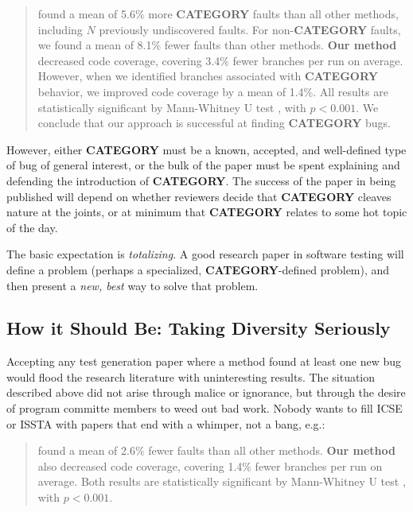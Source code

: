 \documentclass[sigplan,review]{acmart}
\begin{document}
\begin{quote}
 found a mean of 5.6\% more {\bf CATEGORY} faults than all
other methods, including $N$ previously undiscovered faults.  For
non-{\bf CATEGORY} faults, we found a mean of 8.1\% fewer faults than
other methods. {\bf Our
  method} decreased code coverage, covering 3.4\% fewer branches
per run on average.  However, when we identified branches associated
with {\bf CATEGORY} behavior, we improved code coverage by a mean of
1.4\%.  All results are statistically significant by
Mann-Whitney U test \cite{arcuri2014hitchhiker}, with $p < 0.001$.  We
conclude that our approach is successful at finding {\bf CATEGORY} bugs.
\end{quote}

However, either {\bf CATEGORY} must be a known, accepted, and
well-defined type of bug of general interest, or the bulk of the paper
must be spent explaining and defending the introduction of {\bf
  CATEGORY}.  The success of the paper in being published will depend
on whether reviewers decide that {\bf CATEGORY} cleaves nature at the
joints, or at minimum that {\bf CATEGORY} relates to some hot topic of
the day.

The basic expectation is \emph{totalizing}.  A good research paper in
software testing will define a problem (perhaps a specialized, {\bf
  CATEGORY}-defined problem), and then present a \emph{new, best} way
to solve that problem.

\subsection{How it Should Be: Taking Diversity Seriously}

Accepting any test generation paper where a method found at least one
new bug would flood the research literature with uninteresting
results.  The situation described above did not arise through malice
or ignorance, but through the desire of program committe members to
weed out bad work.  Nobody wants to fill ICSE or ISSTA with papers
that end with a whimper, not a bang, e.g.:

\begin{quote}
 found a mean of 2.6\% fewer faults than all
other methods.  {\bf Our
  method} also decreased code coverage, covering 1.4\% fewer branches
per run on average.  Both results are statistically significant by
Mann-Whitney U test \cite{arcuri2014hitchhiker}, with $p < 0.001$.
\end{quote}
\end{document}
